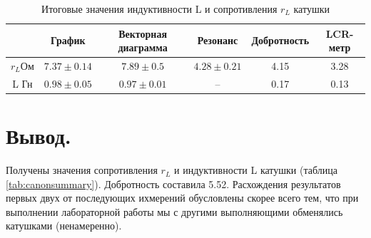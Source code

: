 \documentclass[a4paper,12pt]{article} %
\begin{document}
\begin{table}[H]
\begin{center}
\begin{tabular}{|c|c|c|c|c|c|}
\hline
$\;$ & График & Векторная диаграмма & Резонанс & Добротность & LCR-метр\\
\hline
$r_L \text{Ом}$ & $7.37\pm0.14$ & $7.89\pm0.5$ & $4.28\pm0.21$ & 4.15 & 3.28\\
\hline
L Гн & $0.98\pm0.05$ & $0.97\pm0.01$ & -- & 0.17 & 0.13\\
\hline
\end{tabular}
\caption{\label{tab:canonsummary} Итоговые значения индуктивности L и сопротивления $r_L$ катушки}
\end{center}
\label{table2:ref}
\end{table}

\section{Вывод.}

Получены значения сопротивления $r_L$ и индуктивности L катушки (таблица \eqref{tab:canonsummary}). Добротность составила 5.52. Расхождения результатов первых двух от последующих ихмерений обусловлены скорее всего тем, что при выполнении лабораторной работы мы с другими выполняющими обменялись катушками (ненамеренно).
\end{document}
